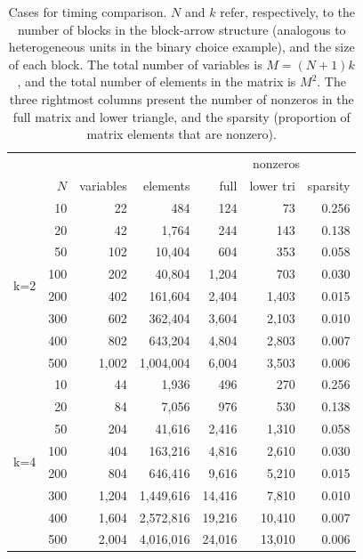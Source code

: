\documentclass[codesnippet,nojss]{jss}\usepackage[]{graphicx}\usepackage[]{color}
\begin{document}
\begin{table}\centering
  \begin{tabular}{rrrrrrr}
    \toprule
    &&&&\multicolumn{3}{c}{nonzeros}\\
    \cmidrule(lr){5-7}
    &$N$&variables&elements&full&lower tri&sparsity\\
    \midrule
 \multirow{8}{*}{k=2} & 10 & 22 & 484 & 124 & 73 & 0.256 \\ 
   & 20 & 42 & 1,764 & 244 & 143 & 0.138 \\ 
   & 50 & 102 & 10,404 & 604 & 353 & 0.058 \\ 
   & 100 & 202 & 40,804 & 1,204 & 703 & 0.030 \\ 
   & 200 & 402 & 161,604 & 2,404 & 1,403 & 0.015 \\ 
   & 300 & 602 & 362,404 & 3,604 & 2,103 & 0.010 \\ 
   & 400 & 802 & 643,204 & 4,804 & 2,803 & 0.007 \\ 
   & 500 & 1,002 & 1,004,004 & 6,004 & 3,503 & 0.006 \\ 
   \midrule
\multirow{8}{*}{k=4} & 10 & 44 & 1,936 & 496 & 270 & 0.256 \\ 
   & 20 & 84 & 7,056 & 976 & 530 & 0.138 \\ 
   & 50 & 204 & 41,616 & 2,416 & 1,310 & 0.058 \\ 
   & 100 & 404 & 163,216 & 4,816 & 2,610 & 0.030 \\ 
   & 200 & 804 & 646,416 & 9,616 & 5,210 & 0.015 \\ 
   & 300 & 1,204 & 1,449,616 & 14,416 & 7,810 & 0.010 \\ 
   & 400 & 1,604 & 2,572,816 & 19,216 & 10,410 & 0.007 \\ 
   & 500 & 2,004 & 4,016,016 & 24,016 & 13,010 & 0.006 \\ 
  
\bottomrule
\end{tabular}
\caption{Cases for timing comparison. $N$ and $k$ refer,
  respectively, to the number of blocks in
  the block-arrow structure (analogous to heterogeneous units in the
  binary choice example), and the size of each block.  The total
  number of variables is $M=(N+1)k$, and the total number of elements
  in the matrix is $M^2$. The three rightmost columns present the
  number of nonzeros in the full matrix and lower triangle, and the
  sparsity (proportion of matrix elements that are nonzero).}\label{tab:cases}
\end{table}
\end{document}
